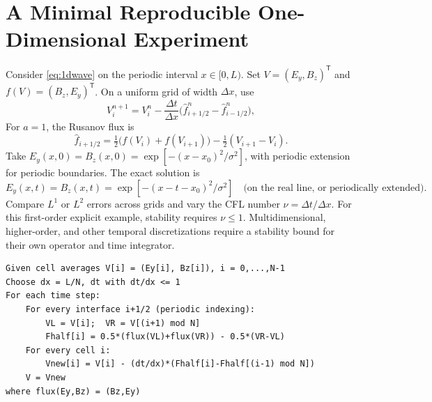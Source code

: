 \documentclass[11pt,openany]{book}
\numberwithin{equation}{chapter}
\theoremstyle{definition}
\theoremstyle{remark}
\begin{document}
\section{A Minimal Reproducible One-Dimensional Experiment}
Consider \eqref{eq:1dwave} on the periodic interval $x\in[0,L)$.
Set $V=(E_y,B_z)^\mathsf T$ and $f(V)=(B_z,E_y)^\mathsf T$.
On a uniform grid of width $\Delta x$, use
\begin{equation}\label{eq:1dfv}
V_i^{n+1}=V_i^n-\frac{\Delta t}{\Delta x}
\bigl(\widehat f_{i+1/2}^n-\widehat f_{i-1/2}^n\bigr),
\end{equation}
For $a=1$, the Rusanov flux is
\begin{equation}
\widehat f_{i+1/2}=\tfrac12\bigl(f(V_i)+f(V_{i+1})\bigr)-\tfrac12(V_{i+1}-V_i).
\end{equation}
Take $E_y(x,0)=B_z(x,0)=\exp[-(x-x_0)^2/\sigma^2]$, with periodic extension for periodic boundaries.
The exact solution is
\begin{equation}
E_y(x,t)=B_z(x,t)=\exp[-(x-t-x_0)^2/\sigma^2]
\quad\text{(on the real line, or periodically extended)}.
\end{equation}
Compare $L^1$ or $L^2$ errors across grids and vary the CFL number $\nu=\Delta t/\Delta x$.
For this first-order explicit example, stability requires $\nu\leq1$.
Multidimensional, higher-order, and other temporal discretizations require a stability bound for their own operator and time integrator.

\begin{lstlisting}[caption={Rusanov finite-volume update on a one-dimensional periodic grid (pseudocode)}]
Given cell averages V[i] = (Ey[i], Bz[i]), i = 0,...,N-1
Choose dx = L/N, dt with dt/dx <= 1
For each time step:
    For every interface i+1/2 (periodic indexing):
        VL = V[i];  VR = V[(i+1) mod N]
        Fhalf[i] = 0.5*(flux(VL)+flux(VR)) - 0.5*(VR-VL)
    For every cell i:
        Vnew[i] = V[i] - (dt/dx)*(Fhalf[i]-Fhalf[(i-1) mod N])
    V = Vnew
where flux(Ey,Bz) = (Bz,Ey)
\end{lstlisting}
\end{document}

